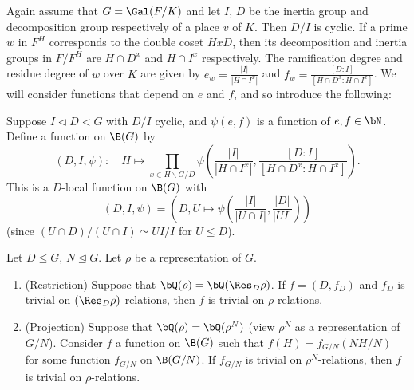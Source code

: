 Again assume that $G = \Gal(F / K)$ and let $I$, $D$ be the inertia group and decomposition group respectively of a place $v$ of $K$.  Then $D / I$ is cyclic. If a prime $w$ in $F^H$ corresponds to the double coset $HxD$, then its decomposition and inertia groups in $F / F^H$ are $H \cap D^x$ and $H \cap I^x$ respectively.
The ramification degree and residue degree of $w$ over $K$ are given by $e_w = \frac{|I|}{|H \cap I^x|}$ and $f_w = \frac{[D : I]}{[H \cap D^x : H \cap I^x]}$. We will consider functions that depend on $e$ and $f$, and so introduce the following:

\begin{defn}\cite[Definition 2.35]{reg-const}\label{D-I-fn}
    Suppose $I \triangleleft D < G$ with $D / I$ cyclic, and $\psi(e,f)$ is a function of $e, f \in \bN$. Define a function on $\B(G)$ by 
    \[ \left(D, I, \psi\right) \colon \quad H \mapsto \prod_{x \in H\backslash G / D} \psi\left(\frac{|I|}{|H \cap I^x|}, \frac{[D : I]}{[H \cap D^x : H \cap I^x]}\right). \]
    This is a $D$-local function on $\B(G)$ with
    \[ (D, I, \psi) = \left(D, U \mapsto \psi\left(\frac{|I|}{|U \cap I|}, \frac{|D|}{|UI|}\right)\right) \]
    (since $(U \cap D) / (U \cap I) \simeq UI / I$ for $U \leq D$).
\end{defn}



\begin{prop}
    Let $D \leq G$, $N \trianglelefteq G$. Let $\rho$ be a representation of $G$.
    \begin{enumerate}
        \item (Restriction) Suppose that $\bQ(\rho) = \bQ(\Res_D \rho)$. If $f = (D, f_D)$ and $f_D$ is trivial on $(\Res_D \rho)$-relations, then $f$ is trivial on $\rho$-relations.
        \item (Projection) Suppose that $\bQ(\rho) = \bQ(\rho^N)$ (view $\rho^N$ as a representation of $G / N$). Consider $f$ a function on $\B(G)$ such that $f(H) = f_{G / N}(N H / N)$ for some function $f_{G / N}$ on $\B(G / N)$. If $f_{G / N}$ is trivial on $\rho^N$-relations, then $f$ is trivial on $\rho$-relations.
    \end{enumerate}
\end{prop}

